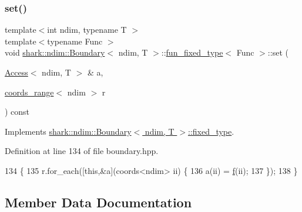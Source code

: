 \subsubsection{\texorpdfstring{set()}{set()}}
{\footnotesize\ttfamily template$<$int ndim, typename T $>$ \\
template$<$typename Func $>$ \\
void \hyperlink{classshark_1_1ndim_1_1_boundary}{shark\+::ndim\+::\+Boundary}$<$ ndim, T $>$\+::\hyperlink{classshark_1_1ndim_1_1_boundary_1_1fun__fixed__type}{fun\+\_\+fixed\+\_\+type}$<$ Func $>$\+::set (\begin{DoxyParamCaption}\item[{\hyperlink{classshark_1_1ndim_1_1_access}{Access}$<$ ndim, T $>$ \&}]{a,  }\item[{\hyperlink{structshark_1_1ndim_1_1coords__range}{coords\+\_\+range}$<$ ndim $>$}]{r }\end{DoxyParamCaption}) const\hspace{0.3cm}{\ttfamily [virtual]}}



Implements \hyperlink{classshark_1_1ndim_1_1_boundary_1_1fixed__type_ad94ec2994049c5107d0ea5d24bf8cff3}{shark\+::ndim\+::\+Boundary$<$ ndim, T $>$\+::fixed\+\_\+type}.



Definition at line 134 of file boundary.\+hpp.


\begin{DoxyCode}
134                                                                                                     \{
135             r.for\_each([\textcolor{keyword}{this},&a](coords<ndim> ii) \{
136                 a(ii) = \hyperlink{classshark_1_1ndim_1_1_boundary_1_1fun__fixed__type_a968985106f368116b458500c16c4476f}{f}(ii);
137             \});
138         \}
\end{DoxyCode}


\subsection{Member Data Documentation}
\hypertarget{classshark_1_1ndim_1_1_boundary_1_1fun__fixed__type_a968985106f368116b458500c16c4476f}{}\label{classshark_1_1ndim_1_1_boundary_1_1fun__fixed__type_a968985106f368116b458500c16c4476f} 
